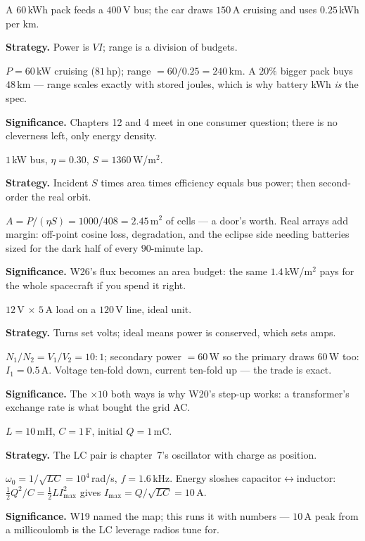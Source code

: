 \begin{example}\label{ex:w35}
A $60$\,kWh pack feeds a $400$\,V bus; the car draws $150$\,A
cruising and uses $0.25$\,kWh per km.
\par\smallskip
\textbf{Strategy.} Power is $VI$; range is a division of budgets.
\begin{solution}
$P=60$\,kW cruising ($81$\,hp); range $=60/0.25=240$\,km.
A $20\%$ bigger pack buys $48$\,km --- range scales exactly with
stored joules, which is why battery kWh \emph{is} the spec.
\checkmark
\end{solution}
\textbf{Significance.} Chapters 12 and 4 meet in one consumer
question; there is no cleverness left, only energy density.
\end{example}

\begin{example}\label{ex:w36}
$1$\,kW bus, $\eta=0.30$, $S=1360$\,W/m$^{2}$.
\par\smallskip
\textbf{Strategy.} Incident $S$ times area times efficiency equals
bus power; then second-order the real orbit.
\begin{solution}
$A=P/(\eta S)=1000/408=2.45$\,m$^{2}$ of cells --- a door's worth.
Real arrays add margin: off-point cosine loss, degradation, and the
eclipse side needing batteries sized for the dark half of every
$90$-minute lap. \checkmark
\end{solution}
\textbf{Significance.} W26's flux becomes an area budget: the same
$1.4$\,kW/m$^{2}$ pays for the whole spacecraft if you spend it
right.
\end{example}

\begin{example}\label{ex:w37}
$12$\,V $\times$ $5$\,A load on a $120$\,V line, ideal unit.
\par\smallskip
\textbf{Strategy.} Turns set volts; ideal means power is conserved,
which sets amps.
\begin{solution}
$N_1/N_2=V_1/V_2=10{:}1$; secondary power $=60$\,W so the primary
draws $60$\,W too: $I_1=0.5$\,A. Voltage ten-fold down, current
ten-fold up --- the trade is exact. \checkmark
\end{solution}
\textbf{Significance.} The $\times10$ both ways is why W20's step-up
works: a transformer's exchange rate is what bought the grid AC.
\end{example}

\begin{example}\label{ex:w38}
$L=10$\,mH, $C=1$\,\textmu F, initial $Q=1$\,mC.
\par\smallskip
\textbf{Strategy.} The LC pair is chapter~7's oscillator with
charge as position.
\begin{solution}
$\omega_0=1/\sqrt{LC}=10^{4}$\,rad/s, $f=1.6$\,kHz.
Energy sloshes capacitor$\leftrightarrow$inductor:
$\tfrac12Q^{2}/C=\tfrac12LI_{\max}^{2}$ gives
$I_{\max}=Q/\sqrt{LC}=10$\,A.
\checkmark
\end{solution}
\textbf{Significance.} W19 named the map; this runs it with numbers
--- $10$\,A peak from a millicoulomb is the LC leverage radios tune
for.
\end{example}

